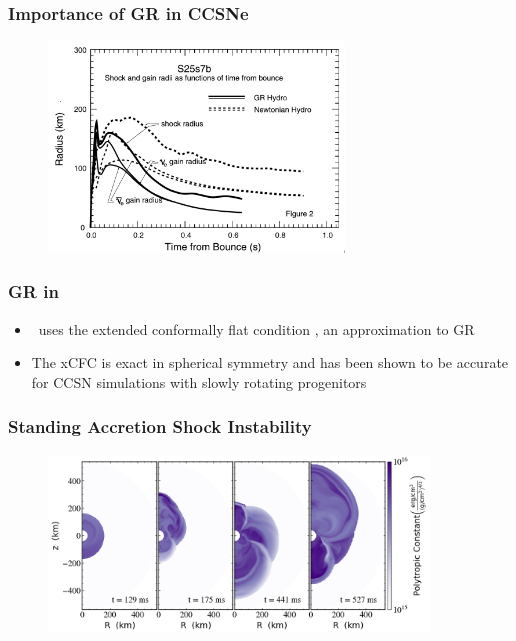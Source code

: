 \documentclass{beamer}
\begin{document}
\begin{frame}
\frametitle{Importance of GR in CCSNe}

  \begin{figure}[htb!]
    \centering
    \includegraphics[width=0.7\textwidth]{fig.WhyGR.png}
  \end{figure}
  \begin{center}\citet{lmt2001}\end{center}

\end{frame}

\begin{frame}
\frametitle{GR in \thornado}

  \begin{itemize}
    \item
      \thornado\ uses the extended conformally flat condition
      \citep[xCFC,][]{wmm1996,ccd2009},
      an approximation to GR
    \item
      The xCFC is exact in spherical symmetry and
      has been shown to be accurate for CCSN simulations
      with slowly rotating progenitors
  \end{itemize}

\end{frame}

\begin{frame}
\frametitle{Standing Accretion Shock Instability}

  \begin{figure}[htb!]
    \centering
    \includegraphics[width=0.9\textwidth]{fig.sasi.png}
  \end{figure}
  \begin{center}\citet{dem2020}\end{center}

\end{frame}
\end{document}
